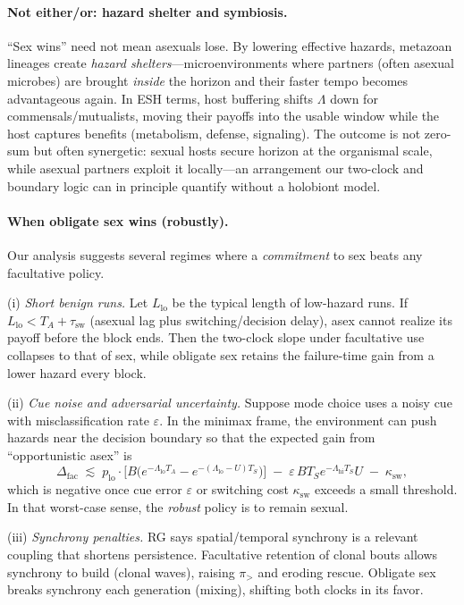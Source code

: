 \documentclass[11pt]{article}
\theoremstyle{upright}
\begin{document}
\paragraph{Not either/or: hazard shelter and symbiosis.}
“Sex wins” need not mean asexuals lose. By lowering effective hazards, metazoan lineages create \emph{hazard shelters}—microenvironments where partners (often asexual microbes) are brought \emph{inside} the horizon and their faster tempo becomes advantageous again. In ESH terms, host buffering shifts $\Lambda$ down for commensals/mutualists, moving their payoffs into the usable window while the host captures benefits (metabolism, defense, signaling). The outcome is not zero-sum but often synergetic: sexual hosts secure horizon at the organismal scale, while asexual partners exploit it locally—an arrangement our two-clock and boundary logic can in principle quantify without a holobiont model.

\paragraph{When obligate sex wins (robustly).}
Our analysis suggests several regimes where a \emph{commitment} to sex beats any facultative policy.

(i) \emph{Short benign runs.} Let $L_{\mathrm{lo}}$ be the typical length of low-hazard runs. If $L_{\mathrm{lo}}<T_A+\tau_{\mathrm{sw}}$ (asexual lag plus switching/decision delay), asex cannot realize its payoff before the block ends. Then the two-clock slope under facultative use collapses to that of sex, while obligate sex retains the failure-time gain from a lower hazard every block.

(ii) \emph{Cue noise and adversarial uncertainty.} Suppose mode choice uses a noisy cue with misclassification rate $\varepsilon$. In the minimax frame, the environment can push hazards near the decision boundary so that the expected gain from “opportunistic asex” is
\[
\Delta_{\mathrm{fac}} \;\lesssim\; p_{\mathrm{lo}}\!\cdot\!\Big[B\!\big(e^{-\Lambda_{\mathrm{lo}} T_A}-e^{-(\Lambda_{\mathrm{lo}}-U)T_S}\big)\Big] \;-\; \varepsilon\,B T_S e^{-\Lambda_{\mathrm{hi}} T_S}U \;-\; \kappa_{\mathrm{sw}},
\]
which is negative once cue error $\varepsilon$ or switching cost $\kappa_{\mathrm{sw}}$ exceeds a small threshold. In that worst-case sense, the \emph{robust} policy is to remain sexual.

(iii) \emph{Synchrony penalties.} RG says spatial/temporal synchrony is a relevant coupling that shortens persistence. Facultative retention of clonal bouts allows synchrony to build (clonal waves), raising $\pi_{>}$ and eroding rescue. Obligate sex breaks synchrony each generation (mixing), shifting both clocks in its favor.
\end{document}
